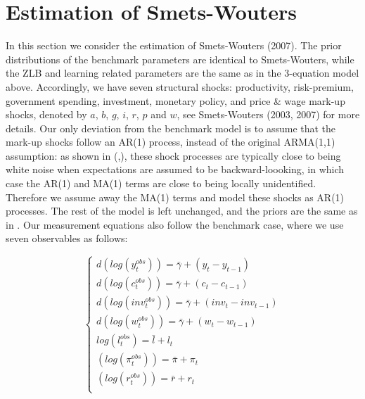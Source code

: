\documentclass[12pt,reqno]{article}
\numberwithin{equation}{section}
\begin{document}
\begin{figure}[H]
\end{figure}

\section{Estimation of Smets-Wouters}

In this section we consider the estimation of Smets-Wouters (2007). The prior distributions of the benchmark parameters are identical to Smets-Wouters, while the ZLB and learning related parameters are the same as in the 3-equation model above. Accordingly, we have seven structural shocks: productivity, risk-premium, government spending, investment, monetary policy, and 
price \& wage mark-up shocks, denoted by $a$, $b$, $g$, $i$, $r$, $p$ and $w$, see Smets-Wouters (2003, 2007) for more details. Our only deviation from the benchmark model is to assume that the mark-up shocks follow an AR(1) process, instead of the original ARMA(1,1) assumption: as shown in \citeauthor{smets2007shocks} (\citeyear{smets2003estimated},\citeyear{smets2007shocks}), these shock processes are typically close to being white noise when expectations are assumed to be backward-loooking, in which case the AR(1) and MA(1) terms are close to being locally unidentified. Therefore we assume away the MA(1) terms and model these shocks as AR(1) processes. The rest of the model is left unchanged, and the priors are the same as in \cite{smets2007shocks}. Our measurement equations also follow the benchmark case, where we use seven observables as follows:

$$
\begin{cases}
 d( log(y^{obs}_t)) = \bar{\gamma} + (y_t - y_{t-1} ) \\
d(log(c^{obs}_t)) = \bar{\gamma} + (c_t - c_{t-1} )\\
d(log({inv}^{obs}_t)) = \bar{\gamma} + ({inv}_t - inv_{t-1} )\\
d(log(w^{obs}_t)) = \bar{\gamma} + (w_t - w_{t-1} )\\
log(l^{obs}_t) = \bar{l} + l_t\\
(log(\pi^{obs}_t)) = \bar{\pi} + \pi_t \\
(log(r^{obs}_t)) = \bar{r} + r_t\\
\end{cases}
$$
\end{document}
